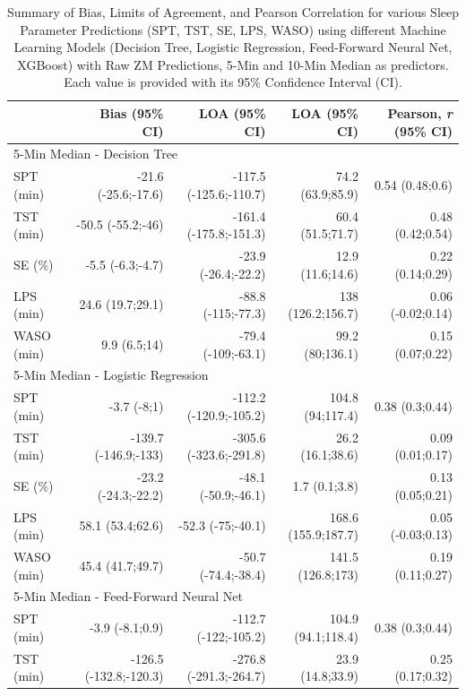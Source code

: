 \documentclass[
  super,
  preprint,
  3p]{elsarticle}
\begin{document}
\hypertarget{tbl-ba_cor}{}
\begin{longtable}{lrrrr}
\caption{\label{tbl-ba_cor}Summary of Bias, Limits of Agreement, and Pearson Correlation for
various Sleep Parameter Predictions (SPT, TST, SE, LPS, WASO) using
different Machine Learning Models (Decision Tree, Logistic Regression,
Feed-Forward Neural Net, XGBoost) with Raw ZM Predictions, 5-Min and
10-Min Median as predictors. Each value is provided with its 95\%
Confidence Interval (CI). }\tabularnewline

\toprule
 & Bias (95\% CI) & LOA (95\% CI) & LOA (95\% CI) & Pearson, \emph{r} (95\% CI) \\ 
\midrule
\multicolumn{5}{l}{5-Min Median - Decision Tree} \\ 
\midrule
SPT (min) & -21.6 (-25.6;-17.6) & -117.5 (-125.6;-110.7) & 74.2 (63.9;85.9) & 0.54 (0.48;0.6) \\ 
TST (min) & -50.5 (-55.2;-46) & -161.4 (-175.8;-151.3) & 60.4 (51.5;71.7) & 0.48 (0.42;0.54) \\ 
SE (\%) & -5.5 (-6.3;-4.7) & -23.9 (-26.4;-22.2) & 12.9 (11.6;14.6) & 0.22 (0.14;0.29) \\ 
LPS (min) & 24.6 (19.7;29.1) & -88.8 (-115;-77.3) & 138 (126.2;156.7) & 0.06 (-0.02;0.14) \\ 
WASO (min) & 9.9 (6.5;14) & -79.4 (-109;-63.1) & 99.2 (80;136.1) & 0.15 (0.07;0.22) \\ 
\midrule
\multicolumn{5}{l}{5-Min Median - Logistic Regression} \\ 
\midrule
SPT (min) & -3.7 (-8;1) & -112.2 (-120.9;-105.2) & 104.8 (94;117.4) & 0.38 (0.3;0.44) \\ 
TST (min) & -139.7 (-146.9;-133) & -305.6 (-323.6;-291.8) & 26.2 (16.1;38.6) & 0.09 (0.01;0.17) \\ 
SE (\%) & -23.2 (-24.3;-22.2) & -48.1 (-50.9;-46.1) & 1.7 (0.1;3.8) & 0.13 (0.05;0.21) \\ 
LPS (min) & 58.1 (53.4;62.6) & -52.3 (-75;-40.1) & 168.6 (155.9;187.7) & 0.05 (-0.03;0.13) \\ 
WASO (min) & 45.4 (41.7;49.7) & -50.7 (-74.4;-38.4) & 141.5 (126.8;173) & 0.19 (0.11;0.27) \\ 
\midrule
\multicolumn{5}{l}{5-Min Median - Feed-Forward Neural Net} \\ 
\midrule
SPT (min) & -3.9 (-8.1;0.9) & -112.7 (-122;-105.2) & 104.9 (94.1;118.4) & 0.38 (0.3;0.44) \\ 
TST (min) & -126.5 (-132.8;-120.3) & -276.8 (-291.3;-264.7) & 23.9 (14.8;33.9) & 0.25 (0.17;0.32) \\ 

\end{longtable}
\end{document}
